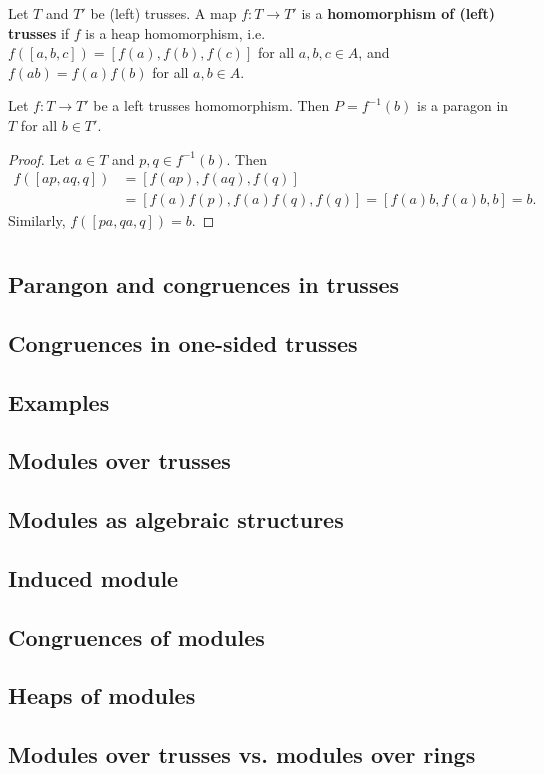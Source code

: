 \documentclass{svmult}
\begin{document}
Let $T$ and $T'$ be (left) trusses. 
A map $f\colon T\to T'$ is a \textbf{homomorphism of (left) trusses} if 
$f$ is a heap homomorphism, i.e. 
$f([a,b,c])=[f(a),f(b),f(c)]$ for all $a,b,c\in A$,
and $f(ab)=f(a)f(b)$ for all $a,b\in A$. 

\begin{proposition}
    Let $f\colon T\to T'$ be a left trusses homomorphism. Then $P=f^{-1}(b)$ 
    is a paragon in $T$ for all $b\in T'$. 
\end{proposition}

\begin{proof}
    Let $a\in T$ and $p,q\in f^{-1}(b)$. Then 
    \begin{align*}
    f([ap,aq,q])&=[f(ap),f(aq),f(q)]\\
    &=[f(a)f(p),f(a)f(q),f(q)]=[f(a)b,f(a)b,b]=b.    
    \end{align*}
    Similarly, $f([pa,qa,q])=b$. 
\end{proof}

\section{}

\subsection{Parangon and congruences in trusses}
\subsection{Congruences in one-sided trusses}
\subsection{Examples}
\subsection{Modules over trusses}
\subsection{Modules as algebraic structures}
\subsection{Induced module}
\subsection{Congruences of modules}
\subsection{Heaps of modules}
\subsection{Modules over trusses vs. modules over rings}





\end{document}

